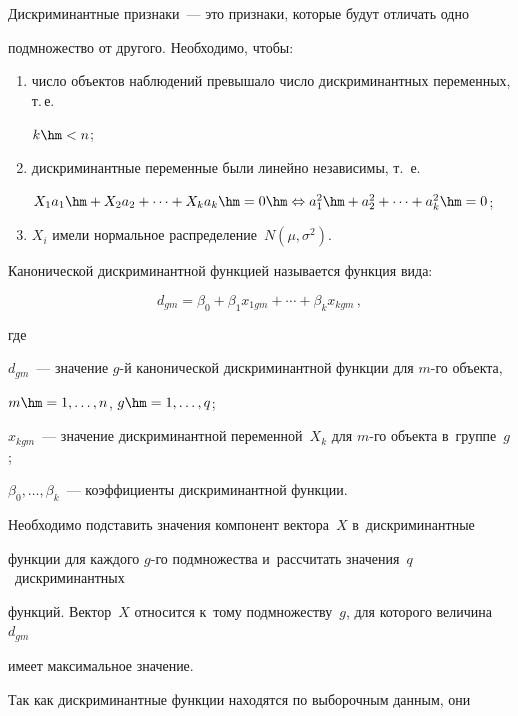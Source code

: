 Дискриминантные признаки~--- это признаки, которые будут отличать одно 

подмножество от другого. Необходимо, чтобы:

\begin{enumerate}[(1)]

\item число объектов наблюдений превышало число дискриминантных переменных, т.\,е.\

 $k\hm<n$;



\item дискриминантные переменные были линейно независимы, т.~е.\

$X_1 a_1\hm+X_2 a_2+\cdots+X_k a_k \hm= 0 \hm\Leftrightarrow 

a_1^2\hm+a_2^2+\cdots+a_k^2 \hm= 0$;



\item $X_i$ имели нормальное распределение~$N(\mu, \sigma^2)$.

\end{enumerate}



Канонической дискриминантной функцией называется функция вида:

$$

d_{gm} = \beta_0 + \beta_1  x_{1gm} + \cdots + \beta_k  x_{kgm}\,,

$$

где

$d_{gm}$~--- значение $g$-й канонической дискриминантной  функции для $m$-го объекта, 

$m \hm= 1, \ldots, n$, $g \hm= 1, \ldots, q$;

$x_{kgm}$~--- значение дискриминантной переменной~$X_k$ для $m$-го объекта в~группе~$g$;

$\beta_0, \ldots, \beta_k$~--- коэффициенты дискриминантной функции.



Необходимо подставить значения компонент вектора~$X$ в~дискриминантные 

функции для каждого $g$-го подмножества и~рассчитать значения~$q$~дискриминантных 

функций. Вектор~$X$ относится к~тому подмножеству~$g$, для которого величина~$d_{gm}$ 

имеет максимальное значение.



Так как дискриминантные функции находятся по выборочным данным, они 

